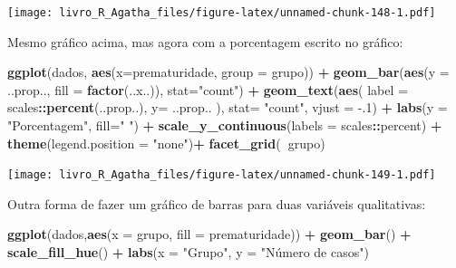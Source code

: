 \documentclass[
]{book}
\newenvironment{Shaded}{\begin{snugshade}}{\end{snugshade}}
\newcommand{\DataTypeTok}[1]{\textcolor[rgb]{0.13,0.29,0.53}{#1}}
\newcommand{\FloatTok}[1]{\textcolor[rgb]{0.00,0.00,0.81}{#1}}
\newcommand{\KeywordTok}[1]{\textcolor[rgb]{0.13,0.29,0.53}{\textbf{#1}}}
\newcommand{\NormalTok}[1]{#1}
\newcommand{\OperatorTok}[1]{\textcolor[rgb]{0.81,0.36,0.00}{\textbf{#1}}}
\newcommand{\StringTok}[1]{\textcolor[rgb]{0.31,0.60,0.02}{#1}}
\begin{document}
\texttt{[image: livro\_R\_Agatha\_files/figure-latex/unnamed-chunk-148-1.pdf]}

Mesmo gráfico acima, mas agora com a porcentagem escrito no gráfico:

\begin{Shaded}
\begin{Highlighting}[]
\KeywordTok{ggplot}\NormalTok{(dados, }\KeywordTok{aes}\NormalTok{(}\DataTypeTok{x=}\NormalTok{prematuridade, }\DataTypeTok{group =}\NormalTok{ grupo))  }\OperatorTok{+}\StringTok{ }
\StringTok{  }\KeywordTok{geom_bar}\NormalTok{(}\KeywordTok{aes}\NormalTok{(}\DataTypeTok{y =}\NormalTok{ ..prop.., }\DataTypeTok{fill =} \KeywordTok{factor}\NormalTok{(..x..)), }\DataTypeTok{stat=}\StringTok{"count"}\NormalTok{) }\OperatorTok{+}
\StringTok{  }\KeywordTok{geom_text}\NormalTok{(}\KeywordTok{aes}\NormalTok{( }\DataTypeTok{label =}\NormalTok{ scales}\OperatorTok{::}\KeywordTok{percent}\NormalTok{(..prop..),}
                 \DataTypeTok{y=}\NormalTok{ ..prop.. ), }\DataTypeTok{stat=} \StringTok{"count"}\NormalTok{, }\DataTypeTok{vjust =} \FloatTok{-.1}\NormalTok{) }\OperatorTok{+}
\StringTok{  }\KeywordTok{labs}\NormalTok{(}\DataTypeTok{y =} \StringTok{"Porcentagem"}\NormalTok{, }\DataTypeTok{fill=}\StringTok{" "}\NormalTok{) }\OperatorTok{+}
\StringTok{  }\KeywordTok{scale_y_continuous}\NormalTok{(}\DataTypeTok{labels =}\NormalTok{ scales}\OperatorTok{::}\NormalTok{percent) }\OperatorTok{+}
\StringTok{  }\KeywordTok{theme}\NormalTok{(}\DataTypeTok{legend.position =} \StringTok{"none"}\NormalTok{)}\OperatorTok{+}
\StringTok{  }\KeywordTok{facet_grid}\NormalTok{(}\OperatorTok{~}\NormalTok{grupo)}
\end{Highlighting}
\end{Shaded}

\texttt{[image: livro\_R\_Agatha\_files/figure-latex/unnamed-chunk-149-1.pdf]}

Outra forma de fazer um gráfico de barras para duas variáveis qualitativas:

\begin{Shaded}
\begin{Highlighting}[]
\KeywordTok{ggplot}\NormalTok{(dados,}\KeywordTok{aes}\NormalTok{(}\DataTypeTok{x =}\NormalTok{ grupo, }\DataTypeTok{fill =}\NormalTok{ prematuridade)) }\OperatorTok{+}
\StringTok{  }\KeywordTok{geom_bar}\NormalTok{() }\OperatorTok{+}
\StringTok{  }\KeywordTok{scale_fill_hue}\NormalTok{() }\OperatorTok{+}
\StringTok{  }\KeywordTok{labs}\NormalTok{(}\DataTypeTok{x =} \StringTok{"Grupo"}\NormalTok{, }\DataTypeTok{y =} \StringTok{"Número de casos"}\NormalTok{)}
\end{Highlighting}
\end{Shaded}
\end{document}

